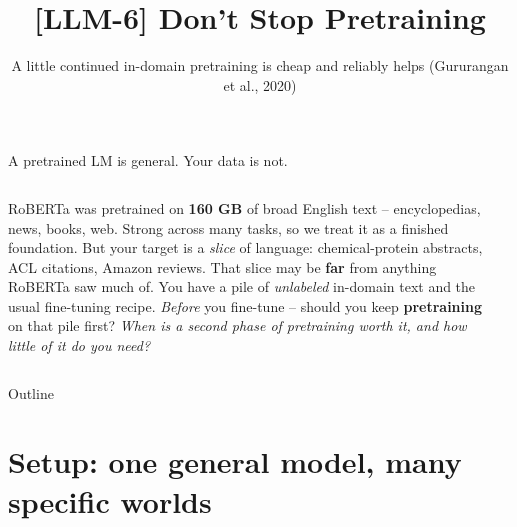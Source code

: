 \documentclass[aspectratio=169]{beamer}
\title{[LLM-6] Don't Stop Pretraining}
\subtitle{A little continued in-domain pretraining is cheap and reliably helps (Gururangan et al., 2020)}
\date{}
\begin{document}
\begin{frame}{A pretrained LM is general. Your data is not.}
  \begin{columns}[T]
    RoBERTa was pretrained on \textbf{160 GB} of broad English text -- encyclopedias,
    news, books, web. Strong across many tasks, so we treat it as a finished foundation.
    \vskip 8pt
    But your target is a \emph{slice} of language: chemical-protein abstracts, ACL
    citations, Amazon reviews. That slice may be \textbf{far} from anything RoBERTa saw
    much of.
    \vskip 8pt
    You have a pile of \emph{unlabeled} in-domain text and the usual fine-tuning recipe.
    \emph{Before} you fine-tune -- should you keep \textbf{pretraining} on that pile first?
    \vskip 8pt
    \emph{When is a second phase of pretraining worth it, and how little of it do you need?}
    \begin{center}
    \end{center}
  \end{columns}
\end{frame}

\begin{frame}{Outline}
  \tableofcontents
\end{frame}

\section{Setup: one general model, many specific worlds}
\end{document}
